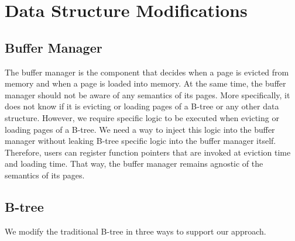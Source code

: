 \section{Data Structure Modifications}
\subsection*{Buffer Manager}
The buffer manager is the component that decides when a page is evicted from memory and when a page is loaded into memory.
At the same time, the buffer manager should not be aware of any semantics of its pages.
More specifically, it does not know if it is evicting or loading pages of a B-tree or any other data structure.
However, we require specific logic to be executed when evicting or loading pages of a B-tree.
We need a way to inject this logic into the buffer manager without leaking B-tree specific logic into the buffer manager itself.
Therefore, users can register function pointers that are invoked at eviction time and loading time.
That way, the buffer manager remains agnostic of the semantics of its pages.

\subsection*{B-tree}
We modify the traditional B-tree in three ways to support our approach.

